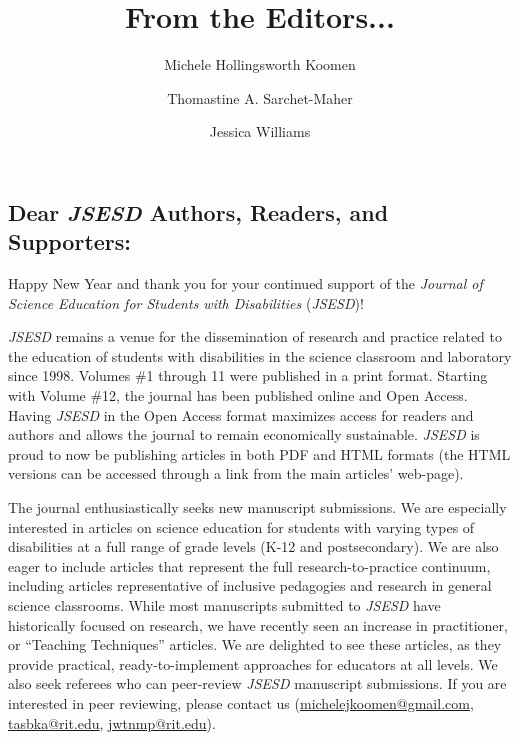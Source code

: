 \documentclass[11.5pt]{sig-alternate}
\begin{document}
\title{From the Editors...}

\author[1]{\large \color{blue} Michele Hollingsworth Koomen}
\author[2]{\large \color{blue} Thomastine A. Sarchet-Maher}
\author[2]{\large \color{blue} Jessica Williams}



\toappear{}

\maketitle

\vspace{5mm}
\begin{large}
\section*{Dear \textit{\textbf{JSESD}} Authors, Readers, and Supporters:}

Happy New Year and thank you for your continued support of the \textit{Journal of Science Education for Students with Disabilities} (\textit{JSESD})! 

\textit{JSESD} remains a venue for the dissemination of research and practice related to the education of students with disabilities in the science classroom and laboratory since 1998. Volumes \#1 through 11 were published in a print format. Starting with Volume \#12, the journal has been published online and Open Access. Having \textit{JSESD} in the Open Access format maximizes access for readers and authors and allows the journal to remain economically sustainable. \textit{JSESD} is proud to now be publishing articles in both PDF and HTML formats (the HTML versions can be accessed through a link from the main articles’ web-page).

The journal enthusiastically seeks new manuscript submissions. We are especially interested in articles on science education for students with varying types of disabilities at a full range of grade levels (K-12 and postsecondary). We are also eager to include articles that represent the full research-to-practice continuum, including articles representative of inclusive pedagogies and research in general science classrooms. While most manuscripts submitted to \textit{JSESD} have historically focused on research, we have recently seen an increase in practitioner, or “Teaching Techniques” articles. We are delighted to see these articles, as they provide practical, ready-to-implement approaches for educators at all levels. We also seek referees who can peer-review \textit{JSESD} manuscript submissions. If you are interested in peer reviewing, please contact us (\href{mailto:michelejkoomen@gmail.com}{michelejkoomen@gmail.com}, \href{mailto:tasbka@rit.edu}{tasbka@rit.edu}, \href{mailto:jwtnmp@rit.edu}{jwtnmp@rit.edu}).


\end{large}
\end{document}
